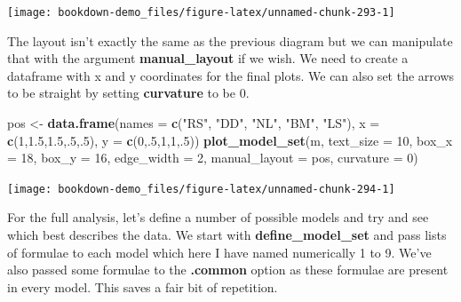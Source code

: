 \documentclass[
]{book}
\newenvironment{Shaded}{\begin{snugshade}}{\end{snugshade}}
\newcommand{\DataTypeTok}[1]{\textcolor[rgb]{0.13,0.29,0.53}{#1}}
\newcommand{\DecValTok}[1]{\textcolor[rgb]{0.00,0.00,0.81}{#1}}
\newcommand{\FloatTok}[1]{\textcolor[rgb]{0.00,0.00,0.81}{#1}}
\newcommand{\KeywordTok}[1]{\textcolor[rgb]{0.13,0.29,0.53}{\textbf{#1}}}
\newcommand{\NormalTok}[1]{#1}
\newcommand{\StringTok}[1]{\textcolor[rgb]{0.31,0.60,0.02}{#1}}
\begin{document}
\begin{center}\texttt{[image: bookdown-demo\_files/figure-latex/unnamed-chunk-293-1]} \end{center}

The layout isn't exactly the same as the previous diagram but we can manipulate that with the argument \textbf{manual\_layout} if we wish. We need to create a dataframe with x and y coordinates for the final plots. We can also set the arrows to be straight by setting \textbf{curvature} to be 0.

\begin{Shaded}
\begin{Highlighting}[]
\NormalTok{pos \textless{}{-}}\StringTok{ }\KeywordTok{data.frame}\NormalTok{(}\DataTypeTok{names =} \KeywordTok{c}\NormalTok{(}\StringTok{"RS"}\NormalTok{, }\StringTok{"DD"}\NormalTok{, }\StringTok{"NL"}\NormalTok{, }\StringTok{"BM"}\NormalTok{, }\StringTok{"LS"}\NormalTok{),}
                  \DataTypeTok{x =} \KeywordTok{c}\NormalTok{(}\DecValTok{1}\NormalTok{,}\FloatTok{1.5}\NormalTok{,}\FloatTok{1.5}\NormalTok{,.}\DecValTok{5}\NormalTok{,.}\DecValTok{5}\NormalTok{),}
                  \DataTypeTok{y =} \KeywordTok{c}\NormalTok{(}\DecValTok{0}\NormalTok{,.}\DecValTok{5}\NormalTok{,}\DecValTok{1}\NormalTok{,}\DecValTok{1}\NormalTok{,.}\DecValTok{5}\NormalTok{))}
\KeywordTok{plot\_model\_set}\NormalTok{(m, }\DataTypeTok{text\_size =} \DecValTok{10}\NormalTok{, }\DataTypeTok{box\_x =} \DecValTok{18}\NormalTok{, }\DataTypeTok{box\_y =} \DecValTok{16}\NormalTok{,}
               \DataTypeTok{edge\_width =} \DecValTok{2}\NormalTok{, }\DataTypeTok{manual\_layout =}\NormalTok{ pos, }\DataTypeTok{curvature =} \DecValTok{0}\NormalTok{)}
\end{Highlighting}
\end{Shaded}

\begin{center}\texttt{[image: bookdown-demo\_files/figure-latex/unnamed-chunk-294-1]} \end{center}

For the full analysis, let's define a number of possible models and try and see which best describes the data. We start with \textbf{define\_model\_set} and pass lists of formulae to each model which here I have named numerically 1 to 9. We've also passed some formulae to the \textbf{.common} option as these formulae are present in every model. This saves a fair bit of repetition.
\end{document}
